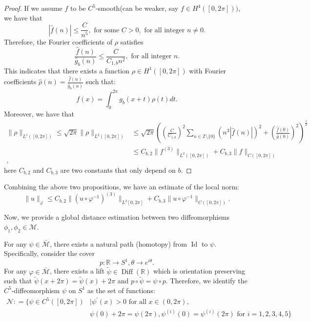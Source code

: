 \documentclass[12pt]{amsart}
\numberwithin{equation}{section}
\theoremstyle{remark}
\begin{document}
\begin{proof}
If we assume $f$ to be $C^5$-smooth(can be weaker, say $f\in H^4([0,2\pi]))$, we have that
\begin{equation}
    |\hat f(n)|\le \frac{C}{n^5}, \text{ for some } C>0, \text{ for all integer } n \neq 0.
\end{equation}
Therefore, the Fourier coefficients of $\rho$ satisfies
\begin{equation}
    \frac{\hat f(n)}{\hat g_b(n)} \le \frac{C}{C_{1,b} n^2}, \text{ for all integer } n.
\end{equation}
This indicates that there exists a function $\rho\in H^1([0,2\pi])$ with Fourier coefficients $\hat \rho(n) = \frac{\hat f(n)}{\hat g_b(n)}$ such that:
\begin{equation}
    f(x) = \int_0^{2\pi} g_b(x+t)\rho(t) dt.
\end{equation}
Moreover, we have that
\begin{equation}
    \begin{aligned}
           \|\rho\|_{L^1([0,2\pi])} \le \sqrt{2\pi}\|\rho\|_{L^2([0,2\pi])} &\le {\sqrt{2\pi}}\left((\frac{C}{C_{1,b}})^2\sum_{n\in \mathbb Z\setminus \{0\}} (n^3|\hat f(n)|)^2+ (\frac{\hat f(0)}{\hat g(0)})^2\right)^{\frac{1}{2}} \\
           &\le C_{b,2} \|f^{(3)}\|_{L^2([0,2\pi])} + C_{b,3}\|f\|_{C([0,2\pi])}\\,
    \end{aligned}
\end{equation}
here $C_{b,2}$ and $C_{b,3}$ are two constants that only depend on $b$.
\end{proof}

Combining the above two propositions, we have an estimate of the local norm:
\begin{equation}
    \|u\|_{\varphi} \le C_{b,2}\|(u\circ \varphi^{-1})^{(3)}\|_{L^2{[0,2\pi]}}+C_{b,3}\|u\circ \varphi^{-1}\|_{C([0,2\pi])}.
\end{equation}

Now, we provide a global distance estimation between two diffeomorphisms $\phi_1, \phi_2\in \mathcal M$.

For any $\psi\in \bar{\mathcal M}$, there exists a natural path (homotopy) from $\operatorname{Id}$ to $\psi$. Specifically,
consider the cover
\begin{equation}
    p:\mathbb R \to S^1, \theta\to e^{i\theta}.
\end{equation}
For any $\varphi\in \bar{\mathcal M}$,
there exists a lift $\tilde \psi\in \operatorname{Diff}(\mathbb R)$ which is orientation preserving such that $\tilde \psi(x+2\pi) = \tilde \psi(x)+2\pi$ and $p\circ \tilde \psi = \psi\circ p$.
Therefore, we identify the $C^5$-diffeomorphism $\psi$ on $S^1$ as the set of functions:
\begin{equation}
    \begin{aligned}
    \mathcal N: =\{\psi \in C^5([0,2\pi]) &\mid \psi^\prime(x)> 0 \text{ for all } x\in (0,2\pi), \\
    &\psi(0)+2\pi = \psi(2\pi), \psi^{(i)}(0) = \psi^{(i)}(2\pi) \text{ for } i=1,2,3,4, 5\}
    \end{aligned}
\end{equation}
\end{document}

